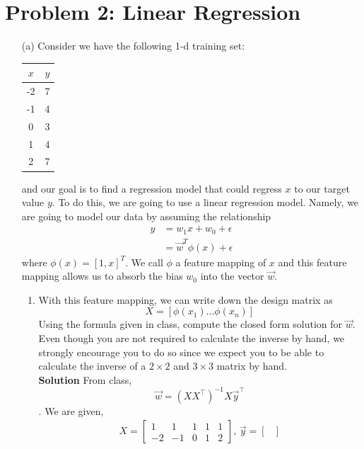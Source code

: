 \documentclass[11pt]{article}
\begin{document}
	\section*{Problem 2: Linear Regression}
	\begin{enumerate}[(1)]
		\item[(a)] Consider we have the following 1-d training set:
		\begin{center}
			
			\begin{tabular}{|c|c|}
				\hline
				$x$ & $y$ \\
				\hline
				-2 & 7 \\
				-1 & 4 \\
				0 & 3 \\
				1 & 4 \\
				2 & 7 \\
				\hline
			\end{tabular}
		\end{center}
		and our goal is to find a regression model that could regress $x$ to our target value $y$. To do this, we are going to use a linear regression model. Namely, we are going to model our data by assuming the relationship
		\begin{align*}
		y &= w_1x + w_0 + \epsilon \\
		&= \vec{w}^T\phi(x) + \epsilon
		\end{align*}
		where $\phi(x) = [1, x]^T$. We call $\phi$ a feature mapping of $x$ and this feature mapping allows us to absorb the bias $w_0$ into the vector $\vec{w}$.
		\begin{enumerate}[(1)]
			\item With this feature mapping, we can write down the design matrix as
			$$X = [\phi(x_1) ... \phi(x_n)]$$
			Using the formula given in class, compute the closed form solution for $\vec{w}$. Even though you are not required to calculate the inverse by hand, we strongly encourage you to do so since we expect you to be able to calculate the inverse of a $2 \times 2$ and $3 \times 3$ matrix by hand.
			\newline \\
			\textbf{Solution} From class, $$\vec{w}=(XX^\top)^{-1}X\vec{y}^\top$$.
			We are given,
			\begin{align*}
			X = \begin{bmatrix}
			1 & 1 & 1 &1 & 1           \\[0.3em]
			-2 & -1 & 0 &1 &2
			\end{bmatrix},\,
			\vec{y} = \begin{bmatrix}

\end{bmatrix}
\end{align*}
\end{enumerate}
\end{enumerate}
\end{document}

